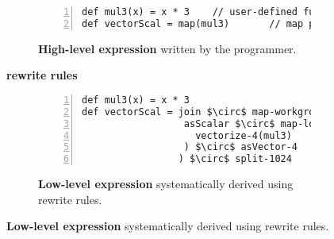 \begin{figure}[t]
\centering

\begin{subfigure}[b]{.85\linewidth}%
\begin{lstlisting}[mathescape,numbers=left]
def mul3(x) = x * 3    // user-defined function
def vectorScal = map(mul3)       // map pattern
\end{lstlisting}
\caption{\textbf{High-level expression} written by the programmer.}
\label{fig:codeex:map}
\end{subfigure}

\vspace{-10pt}
\begin{minipage}{0.1\linewidth}
\vspace{0pt}
\centering
{}
\end{minipage}
\begin{minipage}{0.25\linewidth}
\vspace{-5pt}
\centering
\textbf{rewrite rules}
\end{minipage}
\begin{minipage}{0.1\linewidth}
\vspace{0pt}
\centering
{}
\end{minipage}

\vspace{0pt}
\begin{subfigure}[b]{\linewidth}
\centering
\begin{minipage}{.85\linewidth}%
\begin{lstlisting}[mathescape,numbers=left]
def mul3(x) = x * 3
def vectorScal = join $\circ$ map-workgroup(
                  asScalar $\circ$ map-local(
                    vectorize-4(mul3)
                  ) $\circ$ asVector-4
                 ) $\circ$ split-1024
\end{lstlisting}
\end{minipage}
\caption{\textbf{Low-level expression} systematically derived using rewrite rules.}
\label{fig:codeex:impl}
\end{subfigure}


\end{figure}
